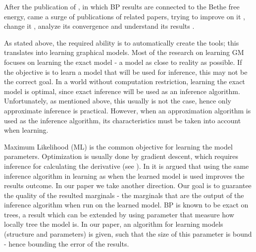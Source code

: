 After the publication of \cite{yedidia2000generalized}, in which BP results are connected to the Bethe free energy, came a surge of publications of related papers, trying to improve on it \cite{elidan2012residual}, change it \cite{welling2001belief, wainwright2003tree, meshi2009convexifying}, analyze its convergence \cite{tatikonda2002loopy, mooij2007sufficient, roosta2008convergence} and understand its results \cite{heskes2002stable, yedidia2005constructing, AlanNips2007, YusukeNips2009, RuozziNips2012}.

As stated above, the required ability is to automatically create the tools; this translates into learning graphical models.
Most of the research on learning GM focuses on learning the exact model - a model as close to reality as possible.
If the objective is to learn a model that will be used for inference, this may not be the correct goal.
In a world without computation restriction, learning the exact model is optimal, since exact inference will be used as an inference algorithm.
Unfortunately, as mentioned above, this usually is not the case, hence only approximate inference is practical.
However, when an approximation algorithm is used as the inference algorithm, its characteristics must be taken into account when learning.

Maximum Likelihood (ML) is the common objective for learning the model parameters.
Optimization is usually done by gradient descent, which requires inference for calculating the derivative (see ).
In \cite{wainwright2006estimating} it is argued that using the same inference algorithm in learning as when the learned model is used improves the results outcome.
In our paper \cite{heinemann2014inferning} we take another direction. Our goal is to guarantee the quality of the resulted marginals - the marginals that are the output of the inference algorithm when run on the learned model.
BP is known to be exact on trees, a result which can be extended by using parameter that measure how locally tree the model is.
In our paper, an algorithm for learning models (structure and parameters) is given, such that the size of this parameter is bound - hence bounding the error of the results.

